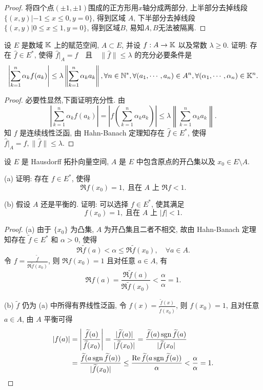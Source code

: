 \begin{proof}
将四个点$(\pm1,\pm1)$围成的正方形用$x$轴分成两部分,
上半部分去掉线段 $\{(x,y)|-1\leq x\leq0,y=0\}$, 得到区域 $A$,
下半部分去掉线段 $\{(x,y)|0\leq x\leq 1,y=0\}$, 得到区域$B$, 易知$A,B$无法被隔离.
\end{proof}



\begin{exercise}
    设 $E$ 是数域 $\mathbb{K}$ 上的赋范空间, $A\subset E$, 并设 $f:A\to\mathbb{K}$
    以及常数 $\lambda\geq 0$. 证明: 存在 $\widehat{f}\in E^*$, 使得
    $\widehat{f}|_A=f\quad\text{且}\quad\|\widehat{f}\|\leq\lambda$
    的充分必要条件是
    \[\left|\sum_{k=1}^n \alpha_kf(a_k)\right|\leq\lambda\left\|\sum_{k=1}^n\alpha_ka_k\right\|,\forall n\in\mathbb{N}^*,
    \forall(a_1,\cdots,a_n)\in A^n,\forall (\alpha_1,\cdots,\alpha_n)\in\mathbb{K}^n.\]
\end{exercise}

\begin{proof}
    必要性显然,下面证明充分性. 由
    \[\left|\sum_{k=1}^n\alpha_kf(a_k)\right|=\left|f\left(\sum_{k=1}^n\alpha_ka_k\right)\right|\leq\lambda\left\|\sum_{k=1}^n\alpha_ka_k\right\|.\]
    知 $f$ 是连续线性泛函, 由 Hahn-Banach 定理知存在 $\hat{f}\in E^{*}$, 使得 $\hat{f}|_A=f,\|\hat{f}\|\leq\lambda$.
\end{proof}



\begin{exercise}
    设 $E$ 是 Hausdorff 拓扑向量空间, $A$ 是 $E$ 中包含原点的开凸集以及 $x_0\in E\setminus A$.

    (a) 证明: 存在 $f\in E^*$, 使得
    \[\Re f(x_0)=1,\;\text{且在\ }A\text{\ 上\ }\Re f<1.\]

    (b) 假设 $A$ 还是平衡的. 证明: 可以选择 $f\in E^*$, 使其满足
    \[f(x_0)=1,\;\text{且在\ }A\text{\ 上\ }|f|<1.\]
\end{exercise}

\begin{proof}
    (a) 由于 $\{x_0\}$ 为凸集, $A$ 为开凸集且二者不相交, 故由 Hahn-Banach 定理知存在
    $\widetilde{f}\in E^*$ 和 $\alpha>0$, 使得
    \[\Re\widetilde{f}(a)<\alpha\leq\Re\widetilde{f}(x_0),\quad\forall a\in A.\]
    令 $f=\frac{\widetilde{f}}{\Re\widetilde{f}(x_0)}$, 则 $\Re f(x_0)=1$ 且对任意 $a\in A$, 有
    \[\Re f(a)=\frac{\Re\widetilde{f}(a)}{\Re\widetilde{f}(x_0)}<\frac{\alpha}{\alpha}=1.\]

    (b) $\widetilde{f}$ 仍为 (a) 中所得有界线性泛函, 令 $f(x)=\frac{\widetilde{f}(x)}{\widetilde{f}(x_0)}$, 则
    $f(x_0)=1$, 且对任意 $a\in A$, 由 $A$ 平衡可得
    \begin{align*}
        |f(a)|
        & =\left|\frac{\widetilde{f}(a)}{\widetilde{f}(x_0)}\right|=\frac{|\widetilde{f}(a)|}{|\widetilde{f}(x_0)|}=\frac{\widetilde{f}(a)\operatorname{sgn}\widetilde{f}(a)}{|\widetilde{f}(x_0|} \\
        & =\frac{\widetilde{f}(a\operatorname{sgn}\widetilde{f}(a))}{|\widetilde{f}(x_0)|}\leq\frac{\operatorname{Re}\widetilde{f}(a\operatorname{sgn}\widetilde{f}(a))}{\alpha}<\frac{\alpha}{\alpha}=1.\qedhere
    \end{align*}
\end{proof}



